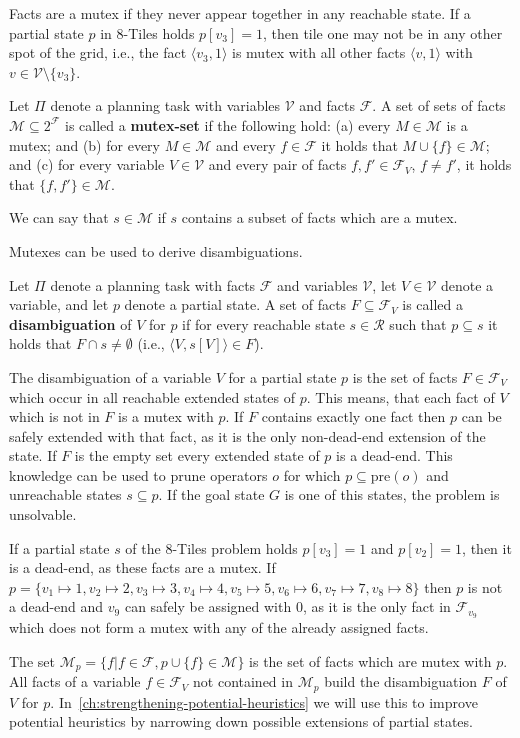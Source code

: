 Facts are a mutex if they never appear together in any reachable state.
If a partial state $p$ in 8-Tiles holds $p[v_3]=1$, then tile one may not be in any other spot of the grid, i.e., the fact $\langle v_3, 1\rangle$ is mutex with all
other facts $\langle v, 1\rangle$ with $v\in \mathcal{V}\setminus \{v_3\}$.

\begin{definition}
    Let $\Pi$ denote a planning task with variables $\mathcal{V}$ and facts $\mathcal{F}$.
    A set of sets of facts $\mathcal{M}\subseteq 2^{\mathcal{F}}$ is called a \textbf{mutex-set} if the following hold:
    (a) every $M\in\mathcal{M}$ is a mutex;
    and (b) for every $M\in\mathcal{M}$ and every $f\in\mathcal{F}$ it holds that $M\cup\{f\}\in\mathcal{M}$;
    and (c) for every variable $V\in\mathcal{V}$ and every pair of facts $f, f'\in\mathcal{F}_V$, $f\neq f'$, it holds
    that $\{f,f'\}\in\mathcal{M}$.
\end{definition}

We can say that $s\in\mathcal{M}$ if $s$ contains a subset of facts which are a mutex.

Mutexes can be used to derive disambiguations.
\begin{definition}
    Let $\Pi$ denote a planning task with facts $\mathcal{F}$ and variables $\mathcal{V}$, let $V\in\mathcal{V}$ denote
    a variable, and let $p$ denote a partial state.
    A set of facts $F\subseteq\mathcal{F}_V$ is called a \textbf{disambiguation} of $V$ for $p$ if for every reachable state
    $s\in\mathcal{R}$ such that $p\subseteq s$ it holds that $F\cap s\neq\emptyset$ (i.e., $\langle V,s[V]\rangle\in F$).
\end{definition}

The disambiguation of a variable $V$ for a partial state $p$ is the set of facts $F\in\mathcal{F}_V$ which occur in all reachable extended states of $p$.
This means, that each fact of $V$ which is not in $F$ is a mutex with $p$.
If $F$ contains exactly one fact then $p$ can be safely extended with that fact, as it is the only non-dead-end extension of the state.
If $F$ is the empty set every extended state of $p$ is a dead-end.
This knowledge can be used to prune operators $o$ for which $p\subseteq\text{pre}(o)$ and unreachable states $s\subseteq p$.
If the goal state $G$ is one of this states, the problem is unsolvable.

If a partial state $s$ of the 8-Tiles problem holds $p[v_3] = 1$ and $p[v_2] = 1$, then it is a dead-end, as these facts are a mutex.
If $p = \{v_1\mapsto1, v_2\mapsto2, v_3\mapsto3, v_4\mapsto4, v_5\mapsto5, v_6\mapsto6, v_7\mapsto7, v_8\mapsto8\}$ then $p$ is not a dead-end and $v_9$ can safely be assigned with $0$, as it is the only fact in $\mathcal{F}_{v_9}$ which does not form a mutex with any of the already assigned facts.

The set $\mathcal{M}_p=\{f|f\in\mathcal{F}, p\cup\{f\}\in\mathcal{M}\}$ is the set of facts which are mutex with $p$.
All facts of a variable $f\in\mathcal{F}_V$ not contained in $\mathcal{M}_p$ build the disambiguation $F$ of $V$ for $p$.
In~\ref{ch:strengthening-potential-heuristics} we will use this to improve potential heuristics by narrowing down possible extensions of partial states.



